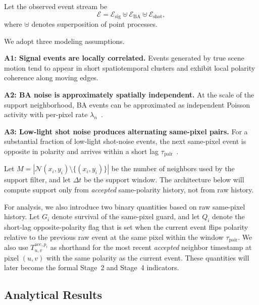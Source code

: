 \documentclass[a4paper,fleqn]{cas-dc}
\begin{document}
Let the observed event stream be
\begin{equation}
\mathcal{E} = \mathcal{E}_{\text{sig}} \uplus \mathcal{E}_{\text{BA}} \uplus \mathcal{E}_{\text{shot}},
\label{eq:stream_superposition}
\end{equation}
where $\uplus$ denotes superposition of point processes.

We adopt three modeling assumptions.

\textbf{A1: Signal events are locally correlated.}
Events generated by true scene motion tend to appear in short spatiotemporal clusters and exhibit local polarity coherence along moving edges.

\textbf{A2: BA noise is approximately spatially independent.}
At the scale of the support neighborhood, BA events can be approximated as independent Poisson activity with per-pixel rate $\lambda_n$~\citep{khodamoradi2018onoise,feng2020density}.

\textbf{A3: Low-light shot noise produces alternating same-pixel pairs.}
For a substantial fraction of low-light shot-noise events, the next same-pixel event is opposite in polarity and arrives within a short lag $\tau_{\text{pair}}$~\citep{mcreynolds2023lowlight}.

Let $M = |\mathcal{N}(x_i,y_i)\setminus \{(x_i,y_i)\}|$ be the number of neighbors used by the support filter, and let $\Delta t$ be the support window. The architecture below will compute support only from \emph{accepted} same-polarity history, not from raw history.

For analysis, we also introduce two binary quantities based on raw same-pixel history. Let $G_i$ denote survival of the same-pixel guard, and let $Q_i$ denote the short-lag opposite-polarity flag that is set when the current event flips polarity relative to the previous raw event at the same pixel within the window $\tau_{\text{pair}}$. We also use $T_{u,v}^{\text{acc},p_i}$ as shorthand for the most recent \emph{accepted} neighbor timestamp at pixel $(u,v)$ with the same polarity as the current event. These quantities will later become the formal Stage~2 and Stage~4 indicators.

\subsection{Analytical Results}
\label{sec:problem_results}
\end{document}
